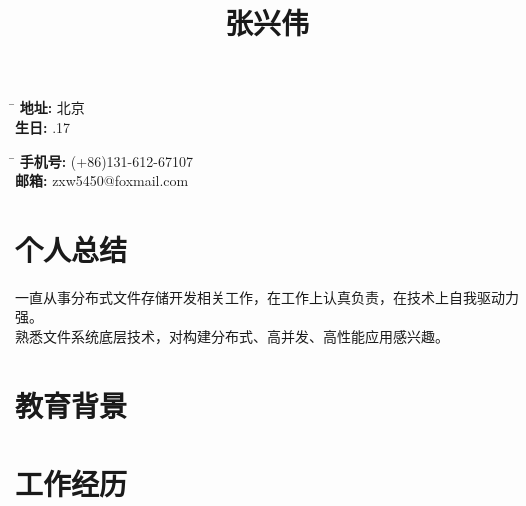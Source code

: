 \documentclass[10pt]{article} %
\begin{document}
\title{张兴伟}
\parbox{2pt}{
\begin{tabbing}
\hspace{1.5cm} \= \hspace{4cm} \kill %
\textbf{地址:} \>北京\\
\textbf{生日:} .17
\end{tabbing}
}
\hfill %
\parbox{2pt}{
\begin{tabbing}
\hspace{1.5cm} \= \hspace{4cm} \kill %
\textbf{手机号:} \>(+86)131-612-67107\\ 
\textbf{邮箱:} \>zxw5450@foxmail.com
\end{tabbing}
}

\section{个人总结}
一直从事分布式文件存储开发相关工作，在工作上认真负责，在技术上自我驱动力强。\\熟悉文件系统底层技术，对构建分布式、高并发、高性能应用感兴趣。
\section{教育背景}
\section{工作经历}
\end{document}
